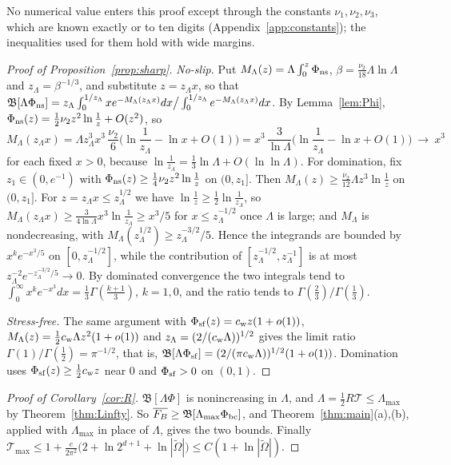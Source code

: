 No numerical value enters this proof except through the constants $\nu_1,\nu_2,\nu_3$, which are known exactly or
to ten digits (Appendix~\ref{app:constants}); the inequalities used for them hold with wide margins.

\begin{proof}[Proof of Proposition~\ref{prop:sharp}]
\emph{No-slip.} Put $M_\Lambda(z)=\Lambda\int_0^z\Phi_{\rm ns}$, $\beta=\frac{\nu_2}{18}\Lambda\ln\Lambda$ and
$z_\Lambda=\beta^{-1/3}$, and substitute $z=z_\Lambda x$, so that
$\mathfrak B[\Lambda\Phi_{\rm ns}]=z_\Lambda\int_0^{1/z_\Lambda}xe^{-M_\Lambda(z_\Lambda x)}dx\big/\int_0^{1/z_\Lambda}e^{-M_\Lambda(z_\Lambda x)}dx$.
By Lemma~\ref{lem:Phi}, $\Phi_{\rm ns}(z)=\frac12\nu_2z^2\ln\frac1z+O(z^2)$, so
\[
M_\Lambda(z_\Lambda x)=\Lambda z_\Lambda^3x^3\,\frac{\nu_2}6\Big(\ln\frac1{z_\Lambda}-\ln x+O(1)\Big)
=x^3\,\frac{3}{\ln\Lambda}\Big(\ln\frac1{z_\Lambda}-\ln x+O(1)\Big)\ \longrightarrow\ x^3
\]
for each fixed $x>0$, because $\ln\frac1{z_\Lambda}=\frac13\ln\Lambda+O(\ln\ln\Lambda)$. For domination, fix $z_1\in(0,e^{-1})$
with $\Phi_{\rm ns}(z)\ge\frac14\nu_2z^2\ln\frac1z$ on $(0,z_1]$. Then $M_\Lambda(z)\ge\frac{\nu_2}{12}\Lambda z^3\ln\frac1z$ on
$(0,z_1]$. For $z=z_\Lambda x\le z_\Lambda^{1/2}$ we have $\ln\frac1z\ge\frac12\ln\frac1{z_\Lambda}$, so
$M_\Lambda(z_\Lambda x)\ge\frac{3}{4\ln\Lambda}x^3\ln\frac1{z_\Lambda}\ge x^3/5$ for $x\le z_\Lambda^{-1/2}$ once $\Lambda$ is large;
and $M_\Lambda$ is nondecreasing, with $M_\Lambda(z_\Lambda^{1/2})\ge z_\Lambda^{-3/2}/5$. Hence the integrands are bounded
by $x^ke^{-x^3/5}$ on $[0,z_\Lambda^{-1/2}]$, while the contribution of $[z_\Lambda^{-1/2},z_\Lambda^{-1}]$ is at most
$z_\Lambda^{-2}e^{-z_\Lambda^{-3/2}/5}\to0$. By dominated convergence the two integrals tend to
$\int_0^\infty x^ke^{-x^3}dx=\frac13\Gamma(\frac{k+1}3)$, $k=1,0$, and the ratio tends to $\Gamma(\frac23)/\Gamma(\frac13)$.

\emph{Stress-free.} The same argument with $\Phi_{\rm sf}(z)=c_{\rm w}z(1+o(1))$,
$M_\Lambda(z)=\frac12c_{\rm w}\Lambda z^2(1+o(1))$ and $z_\Lambda=(2/(c_{\rm w}\Lambda))^{1/2}$ gives the limit ratio
$\Gamma(1)/\Gamma(\frac12)=\pi^{-1/2}$, that is,
$\mathfrak B[\Lambda\Phi_{\rm sf}]=(2/(\pi c_{\rm w}\Lambda))^{1/2}(1+o(1))$. Domination uses
$\Phi_{\rm sf}(z)\ge\frac12c_{\rm w}z$ near $0$ and $\Phi_{\rm sf}>0$ on $(0,1)$.
\end{proof}

\begin{proof}[Proof of Corollary~\ref{cor:R}]
$\mathfrak B[\Lambda\Phi]$ is nonincreasing in $\Lambda$, and $\Lambda=\tfrac12R\mathcal T\le\Lambda_{\max}$ by
Theorem~\ref{thm:Linfty}. So $\overline{F_B}\ge\mathfrak B[\Lambda_{\max}\Phi_{\rm bc}]$, and
Theorem~\ref{thm:main}(a),(b), applied with $\Lambda_{\max}$ in place of $\Lambda$, gives the two bounds. Finally
$\mathcal T_{\max}\le1+\frac{e}{2\pi^2}\big(2+\ln2^{d+1}+\ln|\tilde\Omega|\big)\le C(1+\ln|\tilde\Omega|)$.
\end{proof}

